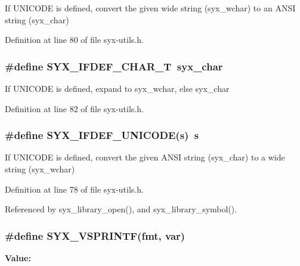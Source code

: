 If UNICODE is defined, convert the given wide string (syx\_\-wchar) to an ANSI string (syx\_\-char) 

Definition at line 80 of file syx-utils.h.\hypertarget{syx-utils_8h_47eb1a8eeabab0af8148bbf785800e6a}{
\subsubsection{\setlength{\rightskip}{0pt plus 5cm}\#define SYX\_\-IFDEF\_\-CHAR\_\-T~{\bf syx\_\-char}}}
\label{syx-utils_8h_47eb1a8eeabab0af8148bbf785800e6a}


If UNICODE is defined, expand to syx\_\-wchar, else syx\_\-char 

Definition at line 82 of file syx-utils.h.\hypertarget{syx-utils_8h_880e9ca9f6d068301042531820aa473a}{
\subsubsection{\setlength{\rightskip}{0pt plus 5cm}\#define SYX\_\-IFDEF\_\-UNICODE(s)~s}}
\label{syx-utils_8h_880e9ca9f6d068301042531820aa473a}


If UNICODE is defined, convert the given ANSI string (syx\_\-char) to a wide string (syx\_\-wchar) 

Definition at line 78 of file syx-utils.h.

Referenced by syx\_\-library\_\-open(), and syx\_\-library\_\-symbol().\hypertarget{syx-utils_8h_91e1a9f99651d305d28a9624c8461d68}{
\subsubsection{\setlength{\rightskip}{0pt plus 5cm}\#define SYX\_\-VSPRINTF(fmt, \/  var)}}
\label{syx-utils_8h_91e1a9f99651d305d28a9624c8461d68}


\textbf{Value:}

